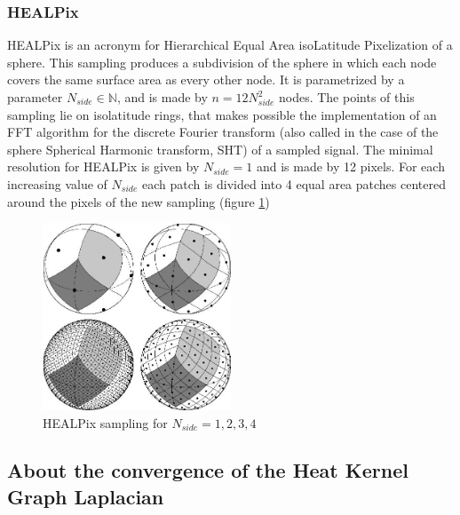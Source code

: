 \subsubsection{HEALPix}\label{sec:Chapter1:HEALPix}
HEALPix is an acronym for Hierarchical Equal Area isoLatitude Pixelization of a sphere. This sampling produces a subdivision of the sphere in which each node covers the same surface area as every other node. It is parametrized by a parameter $N_{side}\in\mathbb N$, and is made by $n=12N_{side}^2$ nodes. The points of this sampling lie on isolatitude rings, that makes possible the implementation of an FFT algorithm for the discrete Fourier transform (also called in the case of the sphere Spherical Harmonic transform, SHT) of a sampled signal. The minimal resolution for HEALPix is given by $N_{side}=1$ and is made by 12 pixels. For each increasing value of $N_{side}$ each patch is divided into 4 equal area patches centered around the pixels of the new sampling (figure \ref{fig:healpix sampling})
\begin{figure}
	\centering
	\includegraphics[width=0.5\textwidth]{figs/chapter1/healpix.jpg}
	\caption{\label{fig:healpix sampling}HEALPix sampling for $N_{side}=1,2,3,4$}
\end{figure}

\subsection{About the convergence of the Heat Kernel Graph Laplacian}

